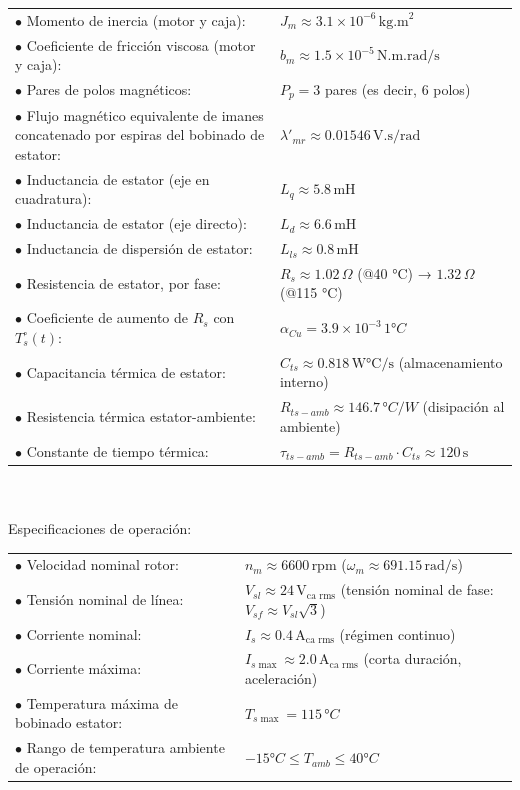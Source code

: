 \documentclass{article}
\begin{document}
    \begin{tabular}{@{} p{} p{} @{}}
        \(\bullet\) Momento de inercia (motor y caja): & \(J_m \approx 3.1 \times 10^{-6} \, \text{kg.m}^2\) \\
        \(\bullet\) Coeficiente de fricción viscosa (motor y caja): & \(b_m \approx 1.5 \times 10^{-5} \, \text{N.m.rad/s}\) \\
        \(\bullet\) Pares de polos magnéticos: & \(P_p = 3\) pares (es decir, 6 polos) \\
        \(\bullet\) Flujo magnético equivalente de imanes concatenado por espiras del bobinado de estator: & \(\lambda'_{mr} \approx 0.01546 \, \text{V.s/rad}\)\\
        \(\bullet\) Inductancia de estator (eje en cuadratura): & \(L_q \approx 5.8 \, \text{mH}\) \\
        \(\bullet\) Inductancia de estator (eje directo): & \(L_d \approx 6.6 \, \text{mH}\) \\
        \(\bullet\) Inductancia de dispersión de estator: & \(L_{ls} \approx 0.8 \, \text{mH}\) \\
        \(\bullet\) Resistencia de estator, por fase: & \(R_s \approx 1.02 \, \Omega\) (@40 °C) → \(1.32 \, \Omega\) (@115 °C) \\
        \(\bullet\) Coeficiente de aumento de \(R_s\) con \(T_s^\circ(t)\): & \(\alpha_{Cu} = 3.9 \times 10^{-3} \, 1°C\) \\
        \(\bullet\) Capacitancia térmica de estator: & \(C_{ts} \approx 0.818 \, \text{W°C/s}\) (almacenamiento interno) \\
        \(\bullet\) Resistencia térmica estator-ambiente: & \(R_{ts-amb} \approx 146.7 \, °C/W\) (disipación al ambiente) \\
        \(\bullet\) Constante de tiempo térmica: & \(\tau_{ts-amb} = R_{ts-amb} \cdot C_{ts} \approx 120 \, \text{s}\)
    \end{tabular}    
    \\\\
    Especificaciones de operación:\\

    \begin{tabular}{@{} p{} p{} @{}}
        \(\bullet\) Velocidad nominal rotor: & \(n_m \approx 6600 \, \text{rpm}\) (\(\omega_m \approx 691.15 \, \text{rad/s}\)) \\
        \(\bullet\) Tensión nominal de línea: & \(V_{sl} \approx 24 \, \text{V}_{\text{ca rms}}\) (tensión nominal de fase: \(V_{sf} \approx V_{sl} \sqrt{3}\)) \\
        \(\bullet\) Corriente nominal: & \(I_s \approx 0.4 \, \text{A}_{\text{ca rms}}\) (régimen continuo) \\
        \(\bullet\) Corriente máxima: & \(I_{s \max} \approx 2.0 \, \text{A}_{\text{ca rms}}\) (corta duración, aceleración) \\
        \(\bullet\) Temperatura máxima de bobinado estator: & \(T_{s \max} = 115 \, °C\) \\
        \(\bullet\) Rango de temperatura ambiente de operación: & \(-15 °C \leq T_{amb} \leq 40 °C\)
    \end{tabular}
\end{document}
